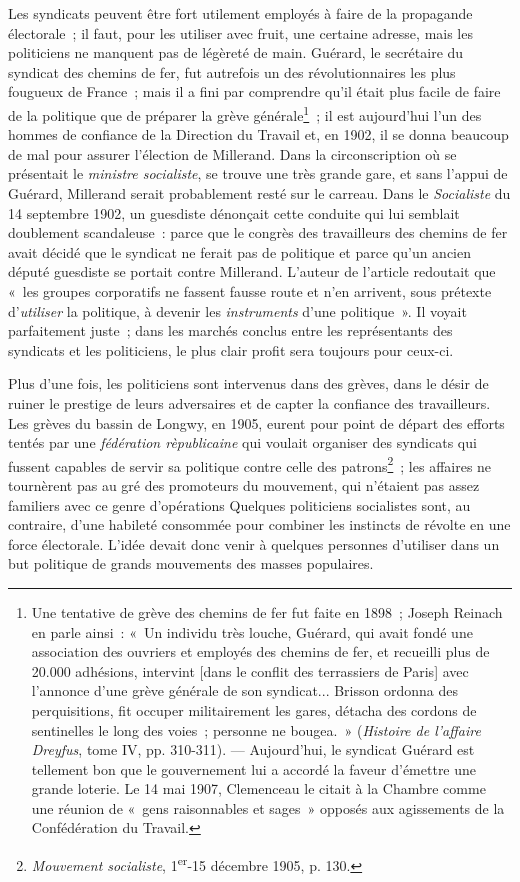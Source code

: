 \documentclass[french,twoside]{book} %
\begin{document}
Les syndicats peuvent être fort utilement employés à faire de la propagande électorale ; il faut, pour les utiliser avec fruit, une certaine adresse, mais les politiciens ne manquent pas de légèreté de main. Guérard, le secrétaire du syndicat des chemins de fer, fut autrefois un des révolutionnaires les plus fougueux de France ; mais il a fini par comprendre qu’il était plus facile de faire de la politique que de préparer la grève générale\footnote{ \noindent Une tentative de grève des chemins de fer fut faite en 1898 ; Joseph Reinach en parle ainsi : « Un individu très louche, Guérard, qui avait fondé une association des ouvriers et employés des chemins de fer, et recueilli plus de 20.000 adhésions, intervint [dans le conflit des terrassiers de Paris] avec l’annonce d’une grève générale de son syndicat... Brisson ordonna des perquisitions, fit occuper militairement les gares, détacha des cordons de sentinelles le long des voies ; personne ne bougea. » (\emph{Histoire de l’affaire Dreyfus}, tome IV, pp. 310-311). — Aujourd’hui, le syndicat Guérard est tellement bon que le gouvernement lui a accordé la faveur d’émettre une grande loterie. Le 14 mai 1907, Clemenceau le citait à la Chambre comme une réunion de « gens raisonnables et sages » opposés aux agissements de la Confédération du Travail.
 } ;  il est aujourd’hui l’un des hommes de confiance de la Direction du Travail et, en 1902, il se donna beaucoup de mal pour assurer l’élection de Millerand. Dans la circonscription où se présentait le \emph{ministre socialiste}, se trouve une très grande gare, et sans l’appui de Guérard, Millerand serait probablement resté sur le carreau. Dans le \emph{Socialiste} du 14 septembre 1902, un guesdiste dénonçait cette conduite qui lui semblait doublement scandaleuse : parce que le congrès des travailleurs des chemins de fer avait décidé que le syndicat ne ferait pas de politique et parce qu’un ancien député guesdiste se portait contre Millerand. L’auteur de l’article redoutait que « les groupes corporatifs ne fassent fausse route et n’en arrivent, sous prétexte d’\emph{utiliser} la politique, à devenir les \emph{instruments} d’une politique ». Il voyait parfaitement juste ; dans les marchés conclus entre les représentants des syndicats et les politiciens, le plus clair profit sera toujours pour ceux-ci.\par
Plus d’une fois, les politiciens sont intervenus dans des grèves, dans le désir de ruiner le prestige de leurs adversaires et de capter la confiance des travailleurs. Les grèves du bassin de Longwy, en 1905, eurent pour point de départ des efforts tentés par une \emph{fédération rèpublicaine } qui voulait organiser des syndicats qui fussent capables de servir sa politique contre celle des patrons\footnote{ \noindent \emph{Mouvement socialiste}, 1\textsuperscript{er}-15 décembre 1905, p. 130.
 } ; les affaires ne tournèrent pas au gré des promoteurs du mouvement, qui n’étaient pas assez familiers avec ce genre d’opérations Quelques politiciens socialistes sont, au contraire, d’une habileté consommée pour combiner les instincts de révolte en une force électorale. L’idée devait donc venir à quelques personnes d’utiliser dans un but politique de grands mouvements des masses populaires.\par
\end{document}
